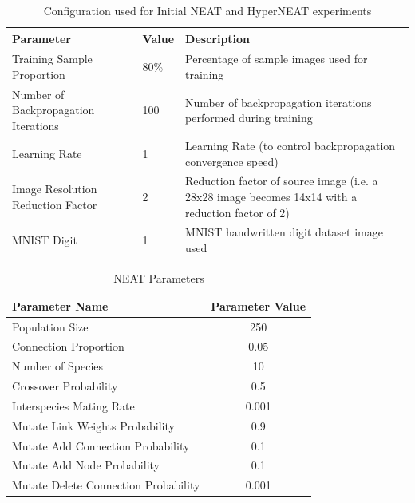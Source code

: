 \documentclass{acm_proc_article-sp}
\begin{document}
\begin{table}[t]
	\caption{Configuration used for Initial NEAT and HyperNEAT experiments}
	\small
	\centering
	\begin{tabular}{|p{5cm}|p{0.8cm}|p{9cm}|}
		\hline\hline
		\textbf{Parameter} & \textbf{Value} & \textbf{Description} \\
		
		\hline
		
		Training Sample Proportion & 80\% & Percentage of sample images used for training \\
		\hline
		Number of Backpropagation Iterations & 100 & Number of backpropagation iterations performed during training \\
		\hline
		Learning Rate & 1 & Learning Rate (to control backpropagation convergence speed) \\
		\hline
		Image Resolution Reduction Factor & 2 & Reduction factor of source image (i.e. a 28x28 image becomes 14x14 with a reduction factor of 2) \\
		\hline
		MNIST Digit & 1 & MNIST handwritten digit dataset image used \\
		
		\hline
	\end{tabular}
	\label{table:initialconfiguration}
\end{table}

\begin{table}[h]
	\caption{NEAT Parameters}
	\small
	\centering
	\begin{tabular}{l c}
		\hline\hline
		\textbf{Parameter Name} & \textbf{Parameter Value} \\
		\hline
		Population Size & 250 \\
		Connection Proportion & 0.05 \\
		Number of Species & 10 \\
		Crossover Probability & 0.5 \\
		Interspecies Mating Rate & 0.001 \\
		Mutate Link Weights Probability & 0.9 \\
		Mutate Add Connection Probability & 0.1 \\
		Mutate Add Node Probability & 0.1 \\
		Mutate Delete Connection Probability & 0.001 \\
		\hline
	\end{tabular}
	\label{table:neatparameters}
\end{table}
\end{document}
